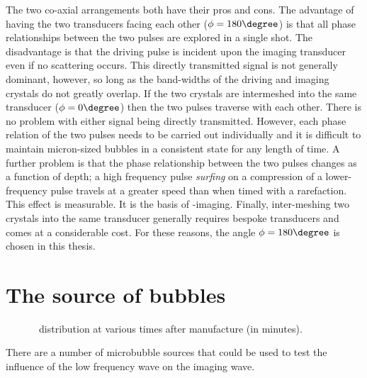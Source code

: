 The two co-axial arrangements both have their pros and cons.
The advantage of having the two transducers facing each other ($\phi = 180\degree$) 
is that all phase relationships between the two pulses are explored in a single shot.
The disadvantage is that the driving pulse is incident upon the imaging transducer even if no scattering occurs.
This directly transmitted signal is not generally dominant, however, so long as the  band-widths of the driving and imaging crystals do not greatly overlap.
If the two crystals are intermeshed into the same transducer ($\phi = 0\degree$) then the two pulses traverse with each other.  
There is no problem with either signal being directly transmitted.
However, each phase relation of the two pulses needs to be carried out individually
and it is difficult to maintain micron-sized bubbles in a consistent state for any length of time.
A further problem is that the phase relationship between the two pulses changes as a function of depth;
a high frequency pulse {\em surfing} on a compression of a lower-frequency pulse travels at a greater speed than when timed with a rarefaction.
This effect is measurable.  It is the basis of {\surf}-imaging\cite{Anderson}.
Finally, inter-meshing two crystals into the same transducer generally requires bespoke transducers
and comes at a considerable cost.
For these reasons, the angle $\phi = 180\degree$ is chosen in this thesis.


\section{The source of bubbles}\label{sec:WE:why_water}

\begin{figure}[t]%
  \centering
    
  \caption{
    \Sonovue\ distribution at various times after manufacture (in minutes).
  }
  \label{fig:sonovue_sizes}
\end{figure}


There are a number of microbubble sources that could be used to test the influence of the low frequency wave 
on the imaging wave.



